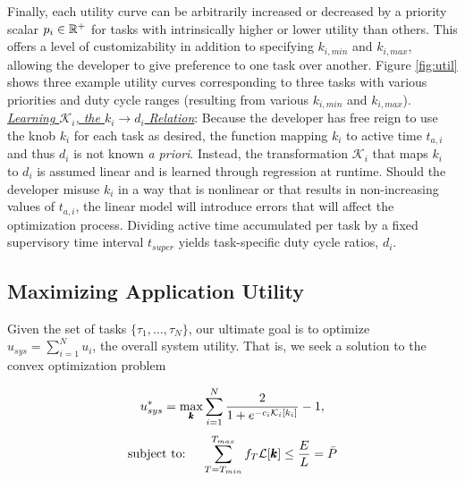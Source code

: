 Finally, each utility curve can be arbitrarily increased or decreased by a priority scalar $p_i \in {\mathbb{R}}^+$ for tasks with intrinsically higher or lower utility than others.  This offers a level of customizability in addition to specifying $k_{i,min}$ and $k_{i,max}$, allowing the developer to give preference to one task over another. Figure \ref{fig:util} shows three example utility curves corresponding to three tasks with various priorities and duty cycle ranges (resulting from various $k_{i,min}$ and $k_{i,max}$). \\

\noindent\emph{\underline{Learning $\mathcal{K}_i$, the $k_i \rightarrow d_{i}$ Relation}}: Because the developer has free reign to use the knob $k_i$ for each task as desired, the function mapping $k_i$ to active time $t_{a,i}$ and thus $d_i$ is not known \emph{a priori}. Instead, the transformation $\mathcal{K}_i$ that maps $k_i$ to $d_{i}$  is assumed linear and is learned through regression at runtime. Should the developer misuse $k_i$ in a way that is nonlinear or that results in non-increasing values of $t_{a,i}$, the linear model will introduce errors that will affect the optimization process. Dividing active time accumulated per task by a fixed supervisory time interval $t_{super}$ yields task-specific duty cycle ratios, $d_i$. 


\subsection{Maximizing Application Utility}
\label{sec:optimization:maxutil}
Given the set of tasks $\{\tau_1,\ldots, \tau_N\}$, our ultimate goal is to optimize $u_{sys} = \sum_{i=1}^Nu_i$, the overall system utility. That is, we seek a solution to the convex optimization problem

\begin{equation}
\label{eq:linprog_util}
u_{sys}^* = \max_{\pmb{k}} \sum_{i=1}^N{ 2\over { 1 + e^{-c_i\mathcal{K}_i[k_i] }} }- 1,
\end{equation}
\begin{align*}
\text{subject to:~~~~} \sum_{T=T_{min}}^{T_{max}}f_T\mathcal{L}[\pmb{k}] \le { E \over L} = \bar{P} \\ 
\end{align*}


